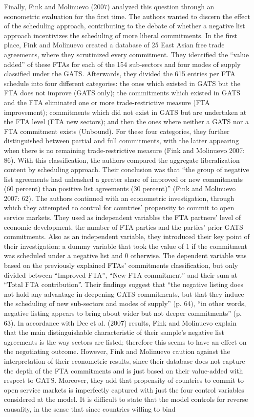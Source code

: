\documentclass{article}
\begin{document}
Finally, Fink and Molinuevo (2007) analyzed this question through an econometric evaluation for the first time. The authors wanted to discern the effect of the scheduling approach, contributing to the debate of whether a negative list approach incentivizes the scheduling of more liberal commitments. In the first place, Fink and Molinuevo created a database of 25 East Asian free trade agreements, where they scrutinized every commitment. They identified the “value added” of these FTAs for each of the 154 sub-sectors and four modes of supply classified under the GATS. Afterwards, they divided the 615 entries per FTA schedule into four different categories: the ones which existed in GATS but the FTA does not improve (GATS only); the commitments which existed in GATS and the FTA eliminated one or more trade-restrictive measure (FTA improvement); commitments which did not exist in GATS but are undertaken at the FTA level (FTA new sectors); and then the ones where neither a GATS nor a FTA commitment exists (Unbound). For these four categories, they further distinguished between partial and full commitments, with the latter appearing when there is no remaining trade-restrictive measure (Fink and Molinuevo 2007: 86). With this classification, the authors compared the aggregate liberalization content by scheduling approach. Their conclusion was that “the group of negative list agreements had unleashed a greater share of improved or new commitments (60 percent) than positive list agreements (30 percent)” (Fink and Molinuevo 2007: 62). The authors continued with an econometric investigation, through which they attempted to control for countries’ propensity to commit to open service markets. They used as independent variables the FTA partners’ level of economic development, the number of FTA parties and the parties’ prior GATS commitments. Also as an independent variable, they introduced their key point of their investigation: a dummy variable that took the value of 1 if the commitment was scheduled under a negative list and 0 otherwise. The dependent variable was based on the previously explained FTAs’ commitments classification, but only divided between “Improved FTA”, “New FTA commitment” and their sum at “Total FTA contribution”. Their findings suggest that “the negative listing does not hold any advantage in deepening GATS commitments, but that they induce the scheduling of new sub-sectors and modes of supply” (p. 64), “in other words, negative listing appears to bring about wider but not deeper commitments” (p. 63). In accordance with Dee et al. (2007) results, Fink and Molinuevo explain that the main distinguishable characteristic of their sample’s negative list agreements is the way sectors are listed; therefore this seems to have an effect on the negotiating outcome. However, Fink and Molinuevo caution against the interpretation of their econometric results, since their database does not capture the depth of the FTA commitments and is just based on their value-added with respect to GATS. Moreover, they add that propensity of countries to commit to open service markets is imperfectly captured with just the four control variables considered at the model. It is difficult to state that the model controls for reverse causality, in the sense that since countries willing to bind 
\end{document}

